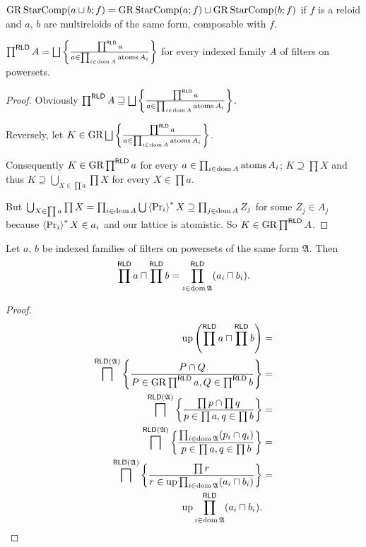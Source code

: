 \begin{conjecture}
$\operatorname{GR}\operatorname{StarComp}(a\sqcup b;f)=\operatorname{GR}\operatorname{StarComp}(a;f)\sqcup\operatorname{GR}\operatorname{StarComp}(b;f)$
if $f$ is a reloid and $a$, $b$ are multireloids of the same form,
composable with $f$.\end{conjecture}
\begin{thm}
$\prod^{\mathsf{RLD}}A=\bigsqcup\left\{ \frac{\prod^{\mathsf{RLD}}a}{a\in\prod_{i\in\operatorname{dom} A}\operatorname{atoms} A_{i}}\right\}$
for every indexed family $A$ of filters on powersets.\end{thm}
\begin{proof}
Obviously $\prod^{\mathsf{RLD}}A\sqsupseteq\bigsqcup\left\{ \frac{\prod^{\mathsf{RLD}}a}{a\in\prod_{i\in\operatorname{dom} A}\operatorname{atoms} A_{i}}\right\}$.

Reversely, let $K\in\operatorname{GR}\bigsqcup\left\{ \frac{\prod^{\mathsf{RLD}}a}{a\in\prod_{i\in\operatorname{dom} A}\operatorname{atoms} A_{i}}\right\}$.

Consequently $K\in\operatorname{GR}\prod^{\mathsf{RLD}}a$ for every $a\in\prod_{i\in\operatorname{dom} A}\operatorname{atoms} A_{i}$;
$K\supseteq\prod X$ and thus $K\supseteq\bigcup_{X\in\prod a}\prod X$
for every $X\in\prod a$.

But $\bigcup_{X\in\prod a}\prod X=\prod_{i\in\operatorname{dom} A}\bigcup\left\langle \Pr_{i}\right\rangle ^{\ast}X\supseteq\prod_{j\in\operatorname{dom} A}Z_{j}$
for some $Z_{j}\in A_{j}$ because $\left\langle \Pr_{i}\right\rangle ^{\ast}X\in a_{i}$
and our lattice is atomistic. So $K\in\operatorname{GR}\prod^{\mathsf{RLD}}A$.\end{proof}
\begin{thm}
Let $a$, $b$ be indexed families of filters on powersets of the
same form $\mathfrak{A}$. Then 
\[
\prod^{\mathsf{RLD}}a\sqcap\prod^{\mathsf{RLD}}b=\prod_{i\in\operatorname{dom}\mathfrak{A}}^{\mathsf{RLD}}(a_{i}\sqcap b_{i}).
\]
\end{thm}
\begin{proof}
~
\begin{align*}
\operatorname{up}\left(\prod^{\mathsf{RLD}}a\sqcap\prod^{\mathsf{RLD}}b\right) & =\\
\bigsqcap^{\mathsf{RLD}(\mathfrak{A})}\left\{ \frac{P\cap Q}{P\in\operatorname{GR}\prod^{\mathsf{RLD}}a,Q\in\prod^{\mathsf{RLD}}b}\right\} & =\\
\bigsqcap^{\mathsf{RLD}(\mathfrak{A})}\left\{ \frac{\prod p\cap\prod q}{p\in\prod a,q\in\prod b}\right\} & =\\
\bigsqcap^{\mathsf{RLD}(\mathfrak{A})}\left\{ \frac{\prod_{i\in\operatorname{dom}\mathfrak{A}}(p_{i}\cap q_{i})}{p\in\prod a,q\in\prod b}\right\} & =\\
\bigsqcap^{\mathsf{RLD}(\mathfrak{A})}\left\{ \frac{\prod r}{r\in\operatorname{up}\prod_{i\in\operatorname{dom}\mathfrak{A}}(a_{i}\sqcap b_{i})}\right\} & =\\
\operatorname{up}\prod_{i\in\operatorname{dom}\mathfrak{A}}^{\mathsf{RLD}}(a_{i}\sqcap b_{i}).
\end{align*}
\end{proof}

